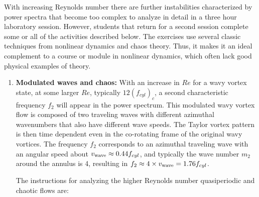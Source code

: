 \documentclass[%
reprint,
 amsmath,amssymb,
 aps,
prb,
floatfix,
longbibliography,
notitlepage
]{revtex4-1}
\begin{document}
With increasing Reynolds number there are further instabilities characterized by power spectra that become too complex to analyze in detail in a three hour laboratory session.  However, students that return for a second session complete some or all of the activities described below. The exercises use several classic techniques from nonlinear dynamics and chaos theory. Thus, it makes it an ideal complement to a course or module in nonlinear dynamics, which often lack good physical examples of theory.

\begin{enumerate}

\item \textbf{Modulated waves and chaos:} With an increase in $Re$ for a wavy vortex state, at some larger $Re$, typically $12( f_{cyl})_c$, a second characteristic frequency $f_2$ will appear in the power spectrum. This modulated wavy vortex flow is composed of two traveling waves with different azimuthal wavenumbers that also have different wave speeds. The Taylor vortex pattern is then time dependent even in the co-rotating frame of the original wavy vortices.  The frequency $f_2$ corresponds to an azimuthal traveling wave with an angular speed about $v_{\rm wave}\approx0.44f_{cyl}$, and typically the wave number $m_2$ around the annulus is 4, resulting in $f_2 \approx 4\times v_{\rm wave}= 1.76 f_{cyl}$.  

The instructions for analyzing the higher Reynolds number quasiperiodic and chaotic flows are:


\end{enumerate}
\end{document}
